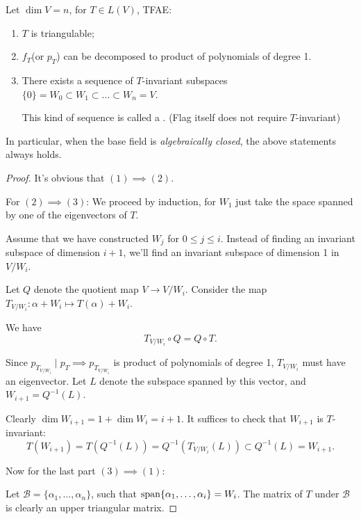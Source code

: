 \begin{proposition}
	Let $\dim V=n$, for  $T\in L(V)$, TFAE:
	\begin{enumerate}[(1)]
		\item $T$ is triangulable;
		\item $f_T$(or $p_T$) can be decomposed to product of polynomials of degree 1.
		\item There exists a sequence of $T$-invariant subspaces
			$\{0\}=W_0 \subset W_1 \subset\dots \subset W_n = V$.

			This kind of sequence is called a .
			(Flag itself does not require $T$-invariant)
	\end{enumerate}
\end{proposition}
\begin{remark}
	In particular, when the base field is \textit{algebraically closed}, the above
	statements always holds.
\end{remark}
\begin{proof}[Proof]
	It's obvious that $(1) \implies (2)$.

	For $(2)\implies (3)$:
	We proceed by induction, for $W_1$ just take the space spanned by
	one of the eigenvectors of $T$.

	Assume that we have constructed $W_j$ for $0\le j\le i$.
	Instead of finding an invariant subspace of dimension $i+1$,
	we'll find an invariant subspace of dimension 1 in  $V / W_i$.


	Let $Q$ denote the quotient map  $V\to V / W_i$.
	Consider the map $T_{V / W_i}: \alpha+W_i \mapsto T(\alpha)+W_i$.

	We have
	\[
		T_{V / W_i}\circ Q = Q\circ T.
	\]
	\begin{center}
	\end{center}

	Since $p_{T_{V / W_i}}\mid p_T \implies p_{T_{V /W_i}}$ is product of
	polynomials of degree 1, $T_{V / W_i}$ must have an eigenvector.
	Let $L$ denote the subspace spanned by this vector,
	and $W_{i+1}=Q^{-1}(L)$.

	Clearly $\dim W_{i+1} = 1 + \dim W_i = i+1$.
	It suffices to check that  $W_{i+1}$ is $T$-invariant:
	\[
	T(W_{i+1}) = T(Q^{-1}(L)) = Q^{-1}(T_{V / W_i}(L)) \subset Q^{-1}(L) = W_{i+1}.
	\]

	Now for the last part $(3)\implies (1)$:

	Let $\mathcal{B} = \{\alpha_1,\dots,\alpha_n\}$,
	such that $\operatorname{span}\{\alpha_1,\dots,\alpha_i\} = W_i$.
	The matrix of $T$ under  $\mathcal{B}$ is clearly an upper triangular matrix.
\end{proof}
